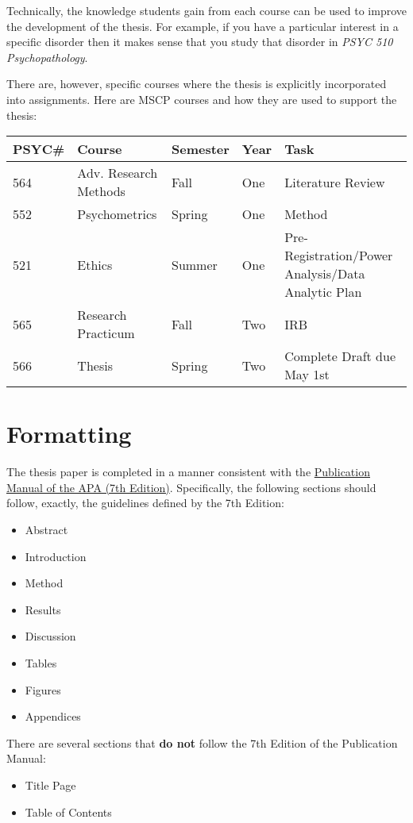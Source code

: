\documentclass[]{book}
\providecommand{\tightlist}{%
  \setlength{\itemsep}{0pt}\setlength{\parskip}{0pt}}
\begin{document}
Technically, the knowledge students gain from each course can be used to improve the development of the thesis. For example, if you have a particular interest in a specific disorder then it makes sense that you study that disorder in \emph{PSYC 510 Psychopathology}.

There are, however, specific courses where the thesis is explicitly incorporated into assignments. Here are MSCP courses and how they are used to support the thesis:

\begin{longtable}[]{@{}lllll@{}}
\toprule
PSYC\# & Course & Semester & Year & Task\tabularnewline
\midrule
\endhead
564 & Adv. Research Methods & Fall & One & Literature Review\tabularnewline
552 & Psychometrics & Spring & One & Method\tabularnewline
521 & Ethics & Summer & One & Pre-Registration/Power Analysis/Data Analytic Plan\tabularnewline
565 & Research Practicum & Fall & Two & IRB\tabularnewline
566 & Thesis & Spring & Two & Complete Draft due May 1st\tabularnewline
\bottomrule
\end{longtable}

\hypertarget{formatting}{%
\chapter{Formatting}\label{formatting}}

The thesis paper is completed in a manner consistent with the \href{https://www.amazon.com/s?k=apa+publication+manual+7th+edition\&crid=7T10VJ2PYQZH\&sprefix=apa+pu\%2Caps\%2C261\&ref=nb_sb_ss_i_1_6}{Publication Manual of the APA (7th Edition)}. Specifically, the following sections should follow, exactly, the guidelines defined by the 7th Edition:

\begin{itemize}
\tightlist
\item
  Abstract
\item
  Introduction
\item
  Method
\item
  Results
\item
  Discussion
\item
  Tables
\item
  Figures
\item
  Appendices
\end{itemize}

There are several sections that \textbf{do not} follow the 7th Edition of the Publication Manual:

\begin{itemize}
\tightlist
\item
  Title Page
\item
  Table of Contents
\end{itemize}
\end{document}
